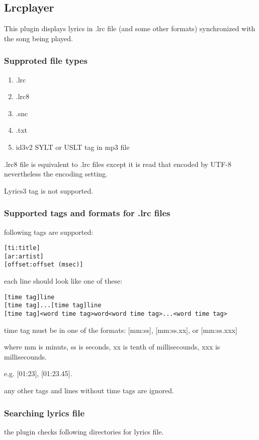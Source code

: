 \subsection{Lrcplayer}
This plugin displays lyrics in .lrc file (and some other formats) synchronized
with the song being played.

\subsubsection{Supproted file types}
\begin{enumerate}
\item .lrc
\item .lrc8
\item .snc
\item .txt
\item id3v2 SYLT or USLT tag in mp3 file
\end{enumerate}

.lrc8 file is equivalent to .lrc files except it is read that
encoded by UTF-8 nevertheless the encoding setting.

Lyrics3 tag is not supported.

\subsubsection{Supported tags and formats for .lrc files}
following tags are supported:
\begin{verbatim}
[ti:title]
[ar:artist]
[offset:offset (msec)]
\end{verbatim}

each line should look like one of these:
\begin{verbatim}
[time tag]line
[time tag]...[time tag]line
[time tag]<word time tag>word<word time tag>...<word time tag>
\end{verbatim}

time tag must be in one of the formats: [mm:ss], [mm:ss.xx], or [mm:ss.xxx]

where mm is minuts, ss is seconds, xx is tenth of millisecounds, xxx is millisecounds.

e.g. [01:23], [01:23.45].

any other tags and lines without time tags are ignored.

\subsubsection{Searching lyrics file}
the plugin checks following directories for lyrics file.

